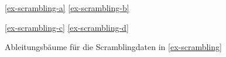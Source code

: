 \begin{figure}[t]
\begin{center}
\ref{ex-scrambling-a}
\hfil
\ref{ex-scrambling-b}


\vspace{5ex}

\ref{ex-scrambling-c}
\hfil
\ref{ex-scrambling-d}


\end{center}
\caption{\label{fig-ttmctag-ableitung}Ableitungsbäume für die Scramblingdaten in \ref{ex-scrambling}}
\end{figure}
